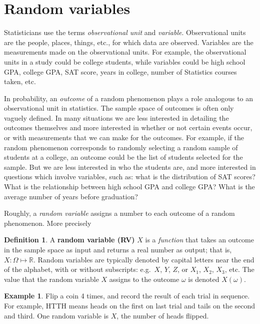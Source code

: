 \documentclass[
]{book}
\theoremstyle{definition}
\newtheorem{definition}{Definition}[chapter]
\theoremstyle{definition}
\newtheorem{example}{Example}[chapter]
\theoremstyle{definition}
\theoremstyle{remark}
\begin{document}
\hypertarget{rv}{%
\section{Random variables}\label{rv}}

Statisticians use the terms \emph{observational unit} and \emph{variable}. Observational units are the people, places, things, etc., for which data are observed. Variables are the measurements made on the observational units. For example, the observational units in a study could be college students, while variables could be high school GPA, college GPA, SAT score, years in college, number of Statistics courses taken, etc.

In probability, an \emph{outcome} of a random phenomenon plays a role analogous to an observational unit in statistics. The sample space of outcomes is often only vaguely defined. In many situations we are less interested in detailing the outcomes themselves and more interested in whether or not certain events occur, or with measurements that we can make for the outcomes. For example, if the random phenomenon corresponds to randomly selecting a random sample of students at a college, an outcome could be the list of students selected for the sample. But we are less interested in who the students are, and more interested in questions which involve variables, such as: what is the distribution of SAT scores? What is the relationship between high school GPA and college GPA? What is the average number of years before graduation?

Roughly, a \emph{random variable} assigns a number to each outcome of a random phenomenon. More precisely

\begin{definition}
\protect\hypertarget{def:rv}{}{\label{def:rv} }
A \textbf{random variable (RV)} \(X\) is a \emph{function} that takes an outcome in the sample space as input and returns a real number as output; that is, \(X:\Omega \mapsto \mathbb{R}\). Random variables are typically denoted by capital letters near the end
of the alphabet, with or without subscripts: e.g.~\(X\), \(Y\), \(Z\), or \(X_1\), \(X_2\), \(X_3\), etc. The value that the random variable \(X\) assigns to the outcome \(\omega\) is denoted \(X(\omega)\).
\end{definition}

\begin{example}
\protect\hypertarget{exm:coin-rv}{}{\label{exm:coin-rv} }
Flip a coin 4 times, and record the result of each trial in sequence. For example, HTTH means heads on the first on last trial and tails on the second and third. One random variable is \(X\), the number of heads flipped.
\end{example}
\end{document}
